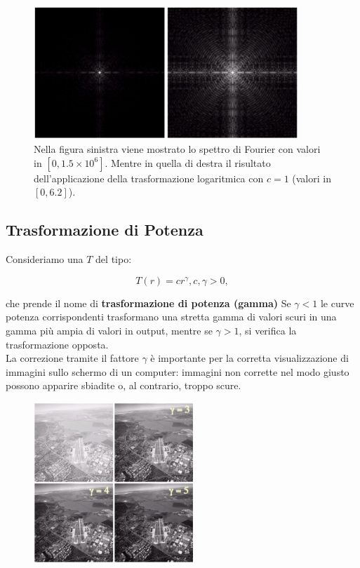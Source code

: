 \begin{figure}[H]
    \centering
    \includegraphics[width=10cm, keepaspectratio]{capitoli/immagini/imgs/trasformazione_logaritmica_esempio_4.jpg}
    \caption{Nella figura sinistra viene mostrato lo spettro di Fourier con
        valori in $[0, 1.5 \times 10^6]$. Mentre in quella di destra il
        risultato dell'applicazione della trasformazione logaritmica con $c = 1$
        (valori in $[0, 6.2]$). }
\end{figure}

\subsection{Trasformazione di Potenza}

Consideriamo una $T$ del tipo:

$$
    T(r) = cr^\gamma, c, \gamma > 0,
$$

che prende il nome di \textbf{trasformazione di potenza (gamma)} Se $\gamma < 1$
le curve potenza corrispondenti trasformano una stretta gamma di valori scuri in
una gamma più ampia di valori in output, mentre se $\gamma > 1$, si verifica la
trasformazione opposta.\\
La correzione tramite il fattore $\gamma$ è importante per la corretta
visualizzazione di immagini sullo schermo di un computer: immagini non corrette
nel modo giusto possono apparire sbiadite o, al contrario, troppo scure.

\begin{figure}[H]
    \centering
    \includegraphics[width=6cm, keepaspectratio]{capitoli/immagini/imgs/foto_esempio_5.jpg}
\end{figure}

